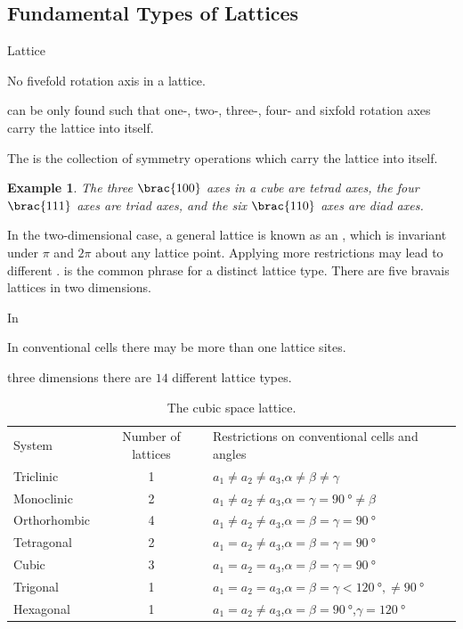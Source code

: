 \documentclass[hidelinks]{article}
\newtheorem{example}{Example}
\begin{document}

\subsection{Fundamental Types of Lattices} %
\label{sub:fundamental_types_of_lattices}

Lattice \begin{marginwarns}
    No fivefold rotation axis in a lattice.
\end{marginwarns} can be only found such that one-, two-, three-, four- and sixfold rotation axes carry the lattice into itself.
\par
The  is the collection of symmetry operations which carry the lattice into itself.
\begin{sample}
    \begin{example}
        The three $\brac{100}$ axes in a cube are tetrad axes, the four $\brac{111}$ axes are triad axes, and the six $\brac{110}$ axes are diad axes.
    \end{example}
\end{sample}
In the two-dimensional case, a general lattice is known as an , which is invariant under $\pi$ and $2\pi$ about any lattice point. Applying more restrictions may lead to different .  is the common phrase for a distinct lattice type. There are five bravais lattices in two dimensions.
\par
In \begin{marginwarns}
    In conventional cells there may be more than one lattice sites.
\end{marginwarns} three dimensions there are $14$ different lattice types.
\begin{table}[ht]
    \begin{tabular}{lcl}
        System & Number of lattices & Restrictions on conventional cells and angles \\
        Triclinic & 1 & $a_1 \neq a_2 \neq a_3$,\quad $\alpha\neq \beta\neq \gamma$ \\
        Monoclinic & 2 & $a_1 \neq a_2 \neq a_3$,\quad $\alpha = \gamma = \SI{90}{\degree} \neq \beta$ \\
        Orthorhombic & 4 & $a_1 \neq a_2 \neq a_3$,\quad $\alpha=\beta=\gamma = \SI{90}{\degree}$ \\
        Tetragonal & 2 & $a_1 = a_2 \neq a_3$,\quad $\alpha=\beta=\gamma = \SI{90}{\degree}$ \\
        Cubic & 3 & $a_1 = a_2 = a_3$,\quad $\alpha = \beta = \gamma = \SI{90}{\degree}$ \\
        Trigonal & 1 & $a_1 = a_2 = a_3$,\quad $\alpha = \beta = \gamma < \SI{120}{\degree}, \neq \SI{90}{\degree}$ \\
        Hexagonal & 1 & $a_1 = a_2 \neq a_3$,\quad $\alpha = \beta = \SI{90}{\degree}$,\quad $\gamma=\SI{120}{\degree}$
    \end{tabular}
    \caption{The cubic space lattice.}
\end{table}
\end{document}
